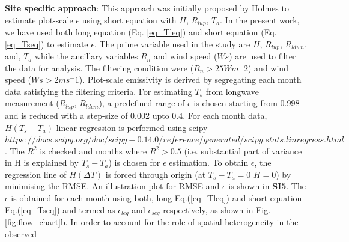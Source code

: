 \documentclass[fleqn,10pt]{wlscirep}
\begin{document}
{\textbf{Site specific approach}:
This approach was initially proposed by Holmes\cite{holmes_land_2009-1} to estimate plot-scale $\epsilon$ using short equation with $H$, $R_{lup}$, $T_{a}$. In the present work, we have used both long equation (Eq. \ref{eq_Tleq}) and short equation (Eq. \ref{eq_Tseq}) to estimate $\epsilon$.
The prime variable used in the study are $H$, $R_{lup}$, $R_{ldwn}$, and, $T_{a}$ while the ancillary variables $R_{n}$ and wind speed ($Ws$) are used to filter the data for analysis. The filtering condition were ($R_{n} > 25 Wm^-2$) and wind speed ($Ws > 2ms^-1$)\cite{holmes_land_2009}. Plot-scale emissivity is derived by segregating each month data satisfying the filtering criteria. For estimating $T_{s}$ from longwave measurement ($R_{lup}$, $R_{ldwn}$), a predefined range of $\epsilon$ is chosen starting from 0.998 and is reduced with a step-size of 0.002 upto 0.4. For each month data, $H (T_{s} - T_{a})$ linear regression is performed using scipy $https://docs.scipy.org/doc/scipy-0.14.0/reference/generated/scipy.stats.linregress.html$. The
$R^2$ is checked and months where $R^{2} > 0.5$ (i.e. substantial part of variance in H is explained by $T_{s} -T_{a}$) is chosen for $\epsilon$ estimation. To obtain $\epsilon$, the regression line of $H (\Delta T)$ is forced through origin (at $T_{s} - T_{a} = 0 $  $H=0$) by minimising the RMSE. An illustration plot for RMSE and $\epsilon$ is shown in \textbf{SI5}. The $\epsilon$ is obtained for each month using both, long Eq.(\ref{eq_Tleq}) and short equation Eq.(\ref{eq_Tseq}) and termed as $\epsilon_{leq}$ and $\epsilon_{seq}$ respectively, as shown in Fig. \ref{fig:flow_chart}b. In order to account for the role of spatial heterogeneity in the observed
}
\end{document}
